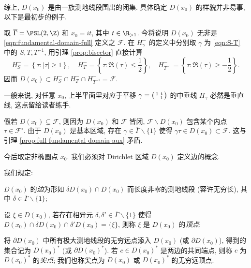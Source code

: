 综上, $D(x_0)$ 是由一族测地线段围出的闭集. 具体确定 $D(x_0)$ 的样貌并非易事, 以下是最初步的例子.
\begin{example}\label{eg:Dirichlet-domain-full}
	取 $\overline{\Gamma} = \PSL(2,\Z)$ 和 $x_0 = it$, 其中 $t \in \R_{> 1}$. 今将说明 $D(x_0)$ 无非是 \eqref{eqn:fundamental-domain-full} 定义之 $\mathcal{F}$. 在 $H_\gamma^-$ 的定义中分别取 $\gamma$ 为 \eqref{eqn:S-T} 中的 $S, T, T^{-1}$, 用引理 \ref{prop:bisector} 直接计算
	\begin{equation*}
		H_S^- = \left\{ \tau : |\tau| \geq 1 \right\}, \quad H_T^- = \left\{ \tau : \Re(\tau) \leq \frac{1}{2} \right\}, \quad H_{T^{-1}}^- = \left\{ \tau : \Re(\tau) \geq -\frac{1}{2} \right\}.
	\end{equation*}
	因而 $D(x_0) \subset H_S^- \cap H_T^- \cap H_{T^{-1}}^- = \mathcal{F}$.

	一般来说, 对任意 $x_0$, 上半平面里对应于平移 $\gamma = \bigl(\begin{smallmatrix} 1 & t \\  & 1 \end{smallmatrix}\bigr)$ 的中垂线 $H_\gamma$ 必然是垂直线, 这点留给读者练手.
	
	假若 $D(x_0) \subsetneq \mathcal{F}$, 则因为 $D(x_0)$ 和 $\mathcal{F}$ 皆闭, $\mathcal{F} \smallsetminus D(x_0)$ 包含某个内点 $\tau \in \mathcal{F}^\circ$. 由于 $D(x_0)$ 是基本区域, 存在 $\gamma \in \overline{\Gamma} \smallsetminus \{1\}$ 使得 $\gamma\tau \in D(x_0) \subset \mathcal{F}$. 这与引理 \ref{prop:full-fundamental-domain-aux} 矛盾.
\end{example}

今后取定非椭圆点 $x_0$. 我们必须对 Dirichlet 区域 $D(x_0)$ 定义边的概念.
\begin{definition}[边, 顶点, 尖点]\label{def:sides}   
	我们规定:
	\begin{compactitem}
		\item $D(x_0)$ 的\emph{边}为形如 $\delta D(x_0) \cap D(x_0)$ 而长度非零的测地线段 (容许无穷长), 其中 $\delta \in \overline{\Gamma} \smallsetminus \{1\}$;
		\item 设 $\xi \in D(x_0)$, 若存在相异元 $\delta, \delta' \in \overline{\Gamma} \smallsetminus \{1\}$ 使得 $D(x_0) \cap \delta D(x_0) \cap \delta' D(x_0) = \{\xi\}$, 则称 $\xi$ 是 $D(x_0)$ 的\emph{顶点};
		\item 将 $\partial D(x_0)$ 中所有极大测地线段的无穷远点添入 $D(x_0)$ (或 $\partial D(x_0)$), 得到的集合记为 $D(x_0)^*$ (或 $\partial D(x_0)^*$). 若 $c \in D(x_0)^*$ 是两边的共同端点, 则称 $c$ 为 $D(x_0)^*$ 的\emph{尖点}; 我们也称尖点为 $D(x_0)$ 或 $D(x_0)^*$ 的无穷远顶点.
	\end{compactitem}
\end{definition}

